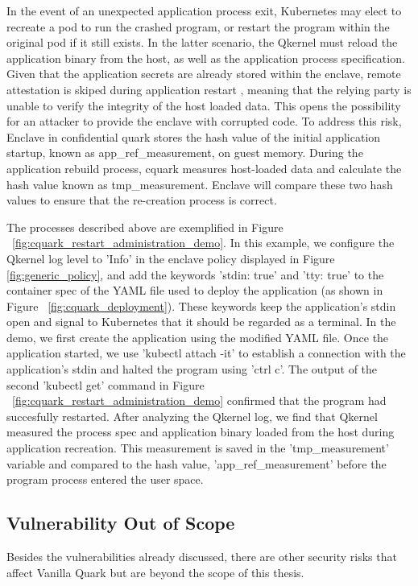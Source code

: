 In the event of an unexpected application process exit, Kubernetes may elect to recreate a pod to run the crashed program, or restart the program within the original pod if it still exists\cite*{k8s}. In the latter scenario, the Qkernel must reload the application 
binary from the host, as well as the application process specification. Given that the application secrets are already stored within the enclave, remote attestation is skiped during application restart , meaning that the relying party is unable 
to verify the integrity of the host loaded data. This opens the possibility for an attacker to provide the enclave with corrupted code. To address this risk, Enclave in confidential quark stores the hash value of the initial application 
startup, known as app\_ref\_measurement, on guest memory. During the application rebuild process, cquark measures host-loaded data and calculate the hash value known as tmp\_measurement.  Enclave will compare these two hash values to ensure that the re-creation 
process is correct.

The processes described above are exemplified in Figure ~\ref{fig:cquark_restart_administration_demo}. In this example, we configure the Qkernel log level to 'Info' in the enclave policy displayed in Figure \ref{fig:generic_policy}, and add the keywords 
'stdin: true' and 'tty: true' to the container spec of the YAML file used to deploy the application (as shown in Figure ~\ref{fig:cquark_deployment}). These keywords keep the application's stdin open and signal to Kubernetes that it should 
be regarded as a terminal. In the demo, we first create the application using the modified YAML file. Once the application started, we use 'kubectl attach -it' to establish a connection with the application's stdin and halted the program using 'ctrl c'. The output of the second 'kubectl get' 
command in Figure ~\ref{fig:cquark_restart_administration_demo} confirmed that the program had succesfully restarted. After analyzing the Qkernel log, we find that Qkernel measured the process spec and application binary loaded from the host during application recreation. This measurement is saved in the 
'tmp\_measurement' variable and compared to the hash value, 'app\_ref\_measurement' before the program process entered the user space.




\subsection{Vulnerability Out of Scope}
Besides the vulnerabilities already discussed, there are other security risks that affect Vanilla Quark but are beyond the scope of this thesis.



